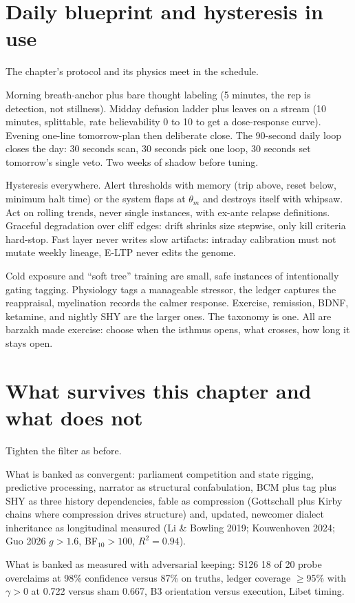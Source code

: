 \section{Daily blueprint and hysteresis in use}

The chapter's protocol and its physics meet in the schedule.

Morning breath-anchor plus bare thought labeling (5 minutes, the rep is detection, not stillness). Midday defusion ladder plus leaves on a stream (10 minutes, splittable, rate believability 0 to 10 to get a dose-response curve). Evening one-line tomorrow-plan then deliberate close. The 90-second daily loop closes the day: 30 seconds scan, 30 seconds pick one loop, 30 seconds set tomorrow's single veto. Two weeks of shadow before tuning.

Hysteresis everywhere. Alert thresholds with memory (trip above, reset below, minimum halt time) or the system flaps at $\theta_m$ and destroys itself with whipsaw. Act on rolling trends, never single instances, with ex-ante relapse definitions. Graceful degradation over cliff edges: drift shrinks size stepwise, only kill criteria hard-stop. Fast layer never writes slow artifacts: intraday calibration must not mutate weekly lineage, E-LTP never edits the genome.

Cold exposure and ``soft tree'' training are small, safe instances of intentionally gating tagging. Physiology tags a manageable stressor, the ledger captures the reappraisal, myelination records the calmer response. Exercise, remission, BDNF, ketamine, and nightly SHY are the larger ones. The taxonomy is one. All are barzakh made exercise: choose when the isthmus opens, what crosses, how long it stays open.

\section{What survives this chapter and what does not}

Tighten the filter as before.

What is banked as convergent: parliament competition and state rigging, predictive processing, narrator as structural confabulation, BCM plus tag plus SHY as three history dependencies, fable as compression (Gottschall plus Kirby chains where compression drives structure) and, updated, newcomer dialect inheritance as longitudinal measured (Li \& Bowling 2019; Kouwenhoven 2024; Guo 2026 $g>1.6$, BF$_{10}>100$, $R^2=0.94$).

What is banked as measured with adversarial keeping: S126 18 of 20 probe overclaims at 98\% confidence versus 87\% on truths, ledger coverage $\geq$95\% with $\gamma > 0$ at 0.722 versus sham 0.667, B3 orientation versus execution, Libet timing.

